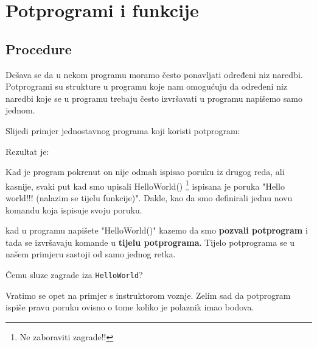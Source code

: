 \section{Potprogrami i funkcije}

\subsection{Procedure}

Dešava se da u nekom programu moramo često ponavljati određeni
niz naredbi. Potprogrami
su strukture u programu koje nam omogućuju da određeni niz naredbi
koje se u programu trebaju često izvršavati u programu napišemo
samo jednom.

Slijedi primjer jednostavnog programa koji koristi potprogram:


Rezultat je:


Kad je program pokrenut on nije odmah ispisao poruku iz drugog
reda, ali kasnije, svaki put kad smo upisali HelloWorld() \footnote{Ne
zaboraviti zagrade!!} ispisana je poruka "Hello world!!! (nalazim
se  tijelu funkcije)". Dakle, kao da smo definirali jednu novu
komandu koja ispisuje svoju poruku. 

kad u programu napišete "HelloWorld()" kazemo da smo
\textbf{pozvali potprogram} i tada se izvršavaju komande u \textbf{tijelu
potprograma}. Tijelo potprograma se u našem primjeru sastoji od samo
jednog retka.

Čemu sluze zagrade iza \verb"HelloWorld"? 

Vratimo se opet na primjer s instruktorom voznje. Zelim sad da
potprogram ispiše pravu poruku ovisno o tome koliko je polaznik imao
bodova. 



